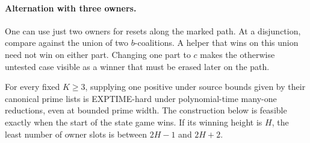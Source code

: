 \paragraph{Alternation with three owners.}
One can use just two owners for resets along the marked path. At a
disjunction, compare against the union of two $b$-coalitions. A helper
that wins on this union need not win on either part. Changing one
part to $c$ makes the otherwise untested case visible as a winner
that must be erased later on the path.

\begin{theorem}
\label{core:thm:three-owner-alternating-bounds}
For every fixed $K\ge3$, supplying one positive under source bounds
given by their canonical prime lists is EXPTIME-hard under
polynomial-time many-one reductions, even at bounded prime width.
The construction below is feasible exactly when the start of the
state game wins. If its winning height is $H$, the least number of
owner slots is between $2H-1$ and $2H+2$.
\end{theorem}
